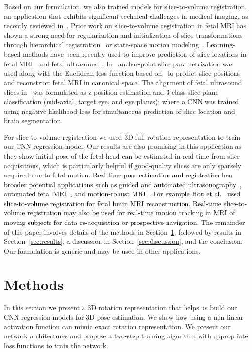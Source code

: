 \documentclass[journal,transmag]{IEEEtran}
\begin{document}
Based on our formulation, we also trained models for slice-to-volume registration, an application that exhibits significant technical challenges in medical imaging, as recently reviewed in~\cite{ferrante2017slice}. Prior work on slice-to-volume registration in fetal MRI has shown a strong need for regularization and initialization of slice transformations through hierarchical registration~\cite{gholipour2010robust,kainz2015fast} or state-space motion modeling~\cite{marami2017temporal}. Learning-based methods have been recently used to improve prediction of slice locations in fetal MRI~\cite{hou2017predicting,hou20183d} and fetal ultrasound~\cite{namburete2018fully}. In~\cite{hou2017predicting,hou20183d} anchor-point slice parametrization was used along with the Euclidean loss function based on~\cite{kendall2015posenet} to predict slice positions and reconstruct fetal MRI in canonical space. The alignment of fetal ultrasound slices in~\cite{namburete2018fully} was formulated as z-position estimation and 3-class slice plane classification (mid-axial, target eye, and eye planes); where a CNN was trained using negative likelihood loss for simultaneous prediction of slice location and brain segmentation.

For slice-to-volume registration we used 3D full rotation representation to train our CNN regression model. Our results are also promising in this application as they show initial pose of the fetal head can be estimated in real time from slice acquisitions, which is particularly helpful if good-quality slices are only sparsely acquired due to fetal motion. \textcolor{black}{Real-time pose estimation and registration has broader potential applications such as guided and automated ultrasonography~\cite{namburete2018fully}, automated fetal MRI~\cite{hou2017predicting,gholipour2014fetal}, and motion-robust MRI~\cite{thesen2000prospective,white2010promo,gholipour2011motion,marami2016motion,kurugol2017motion}.} \textcolor{black}{For example Hou et al.~\cite{hou20183d} used slice-to-volume registration for fetal brain MRI reconstruction. Real-time slice-to-volume registration may also be used for real-time motion tracking in MRI of moving subjects for data re-acquisition or prospective navigation.} The remainder of this paper involves details of the methods in Section~\ref{sec:method}, followed by results in Section~\ref{sec:results}, a discussion in Section~\ref{sec:discussion}, and the conclusion. Our formulation is generic and may be used in other applications.


\section{Methods}
\label{sec:method}
In this section we present a 3D rotation representation that helps us build our CNN regression models for 3D pose estimation. We show how using a non-linear activation function can mimic exact rotation representation. We present our network architectures and propose a two-step training algorithm with appropriate loss functions to train the network.
\end{document}
